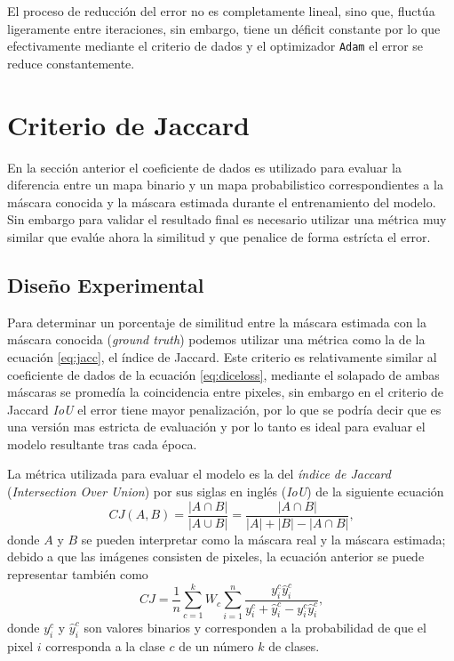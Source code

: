 El proceso de reducción del error no es completamente lineal, sino que, fluctúa ligeramente entre iteraciones, sin embargo, tiene un déficit constante por lo que efectivamente mediante el criterio de dados y el optimizador \texttt{Adam} el error se reduce constantemente.



\clearpage

\section{Criterio de Jaccard}
En la sección anterior el coeficiente de dados es utilizado para evaluar la diferencia entre un mapa binario y un mapa probabilistico correspondientes a la máscara conocida y la máscara estimada durante el entrenamiento del modelo. Sin embargo para validar el resultado final es necesario utilizar una métrica muy similar que evalúe ahora la similitud y que penalice de forma estrícta el error.

\subsection{Diseño Experimental}
Para determinar un porcentaje de similitud entre la máscara estimada con la máscara conocida (\emph{ground truth}) podemos utilizar una métrica como la de la ecuación \ref{eq:jacc}, el índice de Jaccard. Este criterio es relativamente similar al coeficiente de dados de la ecuación \ref{eq:diceloss}, mediante el solapado de ambas máscaras se promedía la coincidencia entre pixeles, sin embargo en el criterio de Jaccard \emph{IoU} el error tiene mayor penalización, por lo que se podría decir que es una versión mas estricta de evaluación y por lo tanto es ideal para evaluar el modelo resultante tras cada época.

La métrica utilizada para evaluar el modelo es la del \emph{índice de Jaccard} (\emph{Intersection Over Union}) por sus siglas en inglés (\emph{IoU}) \citep{fpn_1} de la siguiente ecuación
\begin{equation}\label{eq:jacc}
    CJ(A,B) = \frac{|A \cap B|}{| A \cup B |} = \frac{|A \cap B|}{|A| + |B| - |A \cap B|} \text{,}
\end{equation} 
donde $A$ y $B$ se pueden interpretar como la máscara real y la máscara estimada; debido a que las imágenes consisten de pixeles, la ecuación anterior se puede representar también como
\begin{equation}
    CJ = \frac{1}{n} \sum_{c=1}^{k} W_c \sum_{i=1}^{n}\frac{y_i^c \hat y_i^c}{y_i^c + \hat y_i^c - y_i^c \hat y_i^c} \text{,}
\end{equation} 
donde $y_i^c$ y $\hat y_i^c$ son valores binarios y corresponden a la probabilidad de que el pixel $i$ corresponda a la clase $c$ de un número $k$ de clases.

